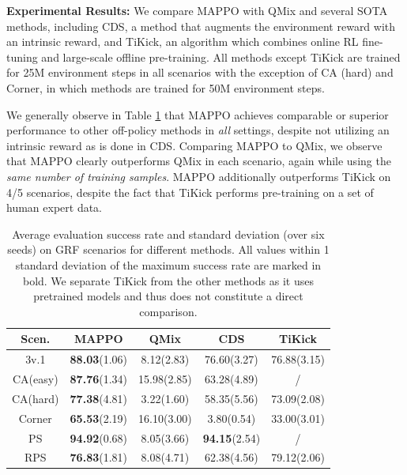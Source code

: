 \documentclass{article}
\theoremstyle{plain}
\theoremstyle{definition}
\theoremstyle{remark}
\begin{document}
\textbf{Experimental Results:} We compare MAPPO with QMix and several SOTA methods, including CDS, a method that augments the environment reward with an intrinsic reward, and TiKick, an algorithm which combines online RL fine-tuning and large-scale offline pre-training. All methods except TiKick are trained for 25M environment steps in all scenarios with the exception of CA (hard) and Corner, in which methods are trained for 50M environment steps. 

We generally observe in Table \ref{tab:football} that MAPPO achieves comparable or superior performance to other off-policy methods in \emph{all} settings, despite not utilizing an intrinsic reward as is done in CDS. Comparing MAPPO to QMix, we observe that MAPPO clearly outperforms QMix in each scenario, again while using the \emph{same number of training samples}. MAPPO additionally outperforms TiKick on 4/5 scenarios, despite the fact that TiKick performs pre-training on a set of human expert data. 


\begin{table}[!t]
\centering
\begin{tabular}{cccc|c}
\toprule
Scen. &       MAPPO &        QMix &         CDS &      TiKick \\
\midrule
          3v.1 & \textbf{88.03}\scriptsize{(1.06)} &  8.12\scriptsize{(2.83)} & 76.60\scriptsize{(3.27)} & 76.88\scriptsize{(3.15)} \\
     CA\scriptsize{(easy)} & \textbf{87.76}\scriptsize{(1.34)} & 15.98\scriptsize{(2.85)} & 63.28\scriptsize{(4.89)} &           / \\
     CA\scriptsize{(hard)} & \textbf{77.38}\scriptsize{(4.81)} &  3.22\scriptsize{(1.60)} & 58.35\scriptsize{(5.56)} & 73.09\scriptsize{(2.08)} \\
      Corner & \textbf{65.53}\scriptsize{(2.19)} & 16.10\scriptsize{(3.00)} & 3.80\scriptsize{(0.54)} & 33.00\scriptsize{(3.01)} \\
          PS & \textbf{94.92}\scriptsize{(0.68)} &  8.05\scriptsize{(3.66)} & \textbf{94.15}\scriptsize{(2.54)} &           / \\
          RPS & \textbf{76.83}\scriptsize{(1.81)} &  8.08\scriptsize{(4.71)} & 62.38\scriptsize{(4.56)} & 79.12\scriptsize{(2.06)} \\
\bottomrule
\end{tabular}
\vspace{1mm}
\caption{Average evaluation success rate and standard deviation (over six seeds) on GRF scenarios for different methods. All values within 1 standard deviation of the maximum success rate are marked in bold. We separate TiKick from the other methods as it uses pretrained models and thus does not constitute a direct comparison.}
\vspace{-3mm}
\label{tab:football}
\end{table}
\end{document}
